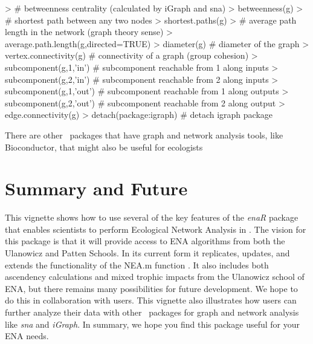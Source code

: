 \documentclass[article]{jss}
\begin{document}
\begin{Schunk}
\begin{Sinput}
> # betweenness centrality (calculated by iGraph and sna)
> betweenness(g)
> # shortest path between any two nodes
> shortest.paths(g)
> # average path length in the network (graph theory sense)
> average.path.length(g,directed=TRUE)
> diameter(g)  # diameter of the graph
> vertex.connectivity(g)  # connectivity of a graph (group cohesion)
> subcomponent(g,1,'in')  # subcomponent reachable from 1 along inputs
> subcomponent(g,2,'in')  # subcomponent reachable from 2 along inputs
> subcomponent(g,1,'out') # subcomponent reachable from 1 along outputs
> subcomponent(g,2,'out') # subcomponent reachable from 2 along output
> edge.connectivity(g)
> detach(package:igraph)  # detach igraph package
\end{Sinput}
\end{Schunk}



There are other \R\ packages that have graph and network analysis tools,
like Bioconductor, that might also be useful for ecologists


\section{Summary and Future}
This vignette shows how to use several of the key features of the
\textit{enaR} package that enables scientists to perform Ecological
Network Analysis in \R.  The vision for this package is that it will
provide access to ENA algorithms from both the Ulanowicz and Patten
Schools.  In its current form it replicates, updates, and extends the
functionality of the NEA.m function \citep{fath06}.  It also includes
both ascendency calculations and mixed trophic impacts from the
Ulanowicz school of ENA, but there remains many possibilities for
future development.  We hope to do this in collaboration with
users. This vignette also illustrates how users can further analyze
their data with other \R\ packages for graph and network analysis like
\textit{sna} and \textit{iGraph}.  In summary, we hope you find this
package useful for your ENA needs.



\end{document}
